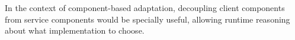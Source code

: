 In the context of component-based adaptation, decoupling client components from service components would be specially useful, allowing runtime reasoning about what implementation to choose.
%
%
%

%
